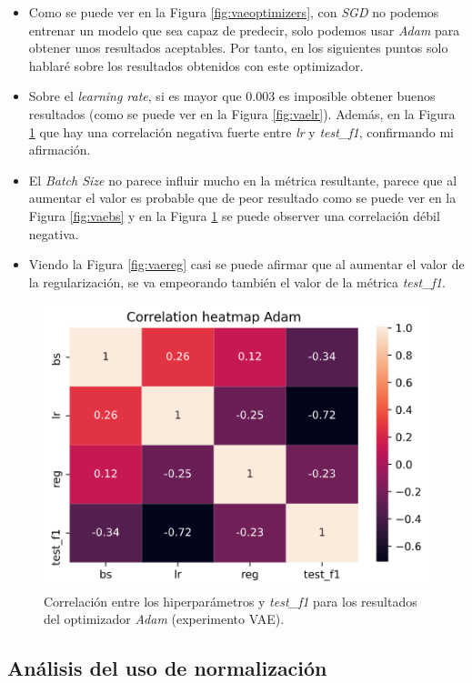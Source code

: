 \begin{itemize}
    \item Como se puede ver en la Figura \ref{fig:vaeoptimizers}, con \textit{SGD} no podemos entrenar un modelo que sea capaz de predecir, solo podemos usar \textit{Adam} para obtener unos resultados aceptables. Por tanto, en los siguientes puntos solo hablaré sobre los resultados obtenidos con este optimizador.
    \item Sobre el \textit{learning rate}, si es mayor que 0.003 es imposible obtener buenos resultados (como se puede ver en la Figura \ref{fig:vaelr}). Además, en la Figura \ref{fig:vaecorr} que hay una correlación negativa fuerte entre \textit{lr} y \textit{test\_f1}, confirmando mi afirmación.
    \item El \textit{Batch Size} no parece influir mucho en la métrica resultante, parece que al aumentar el valor es probable que de peor resultado como se puede ver en la Figura \ref{fig:vaebs} y en la Figura \ref{fig:vaecorr} se puede observer una correlación débil negativa.
    \item Viendo la Figura \ref{fig:vaereg} casi se puede afirmar que al aumentar el valor de la regularización, se va empeorando también el valor de la métrica \textit{test\_f1}.
\end{itemize}

\begin{figure}[H]
  \centering
  \includegraphics[width=.8\linewidth]{imagenes/06_Experimentacion/vae/vaeadamcorr.png} 
  \caption{Correlación entre los hiperparámetros y \textit{test\_f1} para los resultados del optimizador \textit{Adam} (experimento VAE).}
  \label{fig:vaecorr}
\end{figure}

\subsection{Análisis del uso de normalización}

